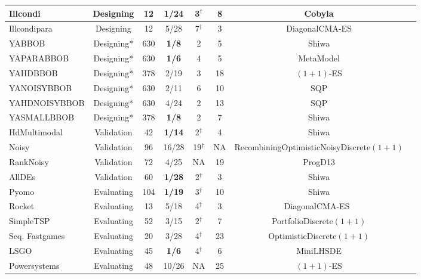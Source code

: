 \begin{table}[t]
{\begin{tabular}{|l|c|c|c|c|c|c|c|}
        Illcondi & Designing & 12 &\textbf{ 1/24 }&  3$^\dagger$ & 8 & {Cobyla} \\ \hline
        Illcondipara & Designing & 12 & 5/28 & 7$^\dagger$ & 3 &{ DiagonalCMA-ES} \\ \hline
        YABBOB & Designing* & 630 & \textbf{1/8} & 2 &   5 & Shiwa \\ \hline 
        YAPARABBOB & Designing* & 630 & \textbf{1/6} & 4 &    5 &  MetaModel\\ \hline 		
        YAHDBBOB & Designing* & 378 & 2/19 & 3 &   18 & {$(1+1)$-ES}\\ \hline
        YANOISYBBOB & Designing* & 630 & 2/11 & 6 & 10 & {SQP} \\ \hline
        YAHDNOISYBBOB & Designing* & 630 & 4/24 & 2 & 13 & {SQP} \\ \hline 		  
        YASMALLBBOB & Designing* & 378 & \textbf{1/8} & 2 & 7 & Shiwa \\ 		  \hline
        \hline
                HdMultimodal & Validation  & 42 & \textbf{1/14} &  2$^\dagger$ &4 & {Shiwa} \\ \hline
        Noisy & Validation & 96 & 16/28 & 19$^\dagger$ &NA & {RecombiningOptimisticNoisyDiscrete$(1+1)$}\\ \hline
        RankNoisy & Validation  & 72 & 4/25 & NA & 19 & {ProgD13} \\ \hline
        AllDEs & Validation & 60 & \textbf{1/28} &  2$^\dagger$ & 3 & {Shiwa} \\ \hline 		 \hline
        Pyomo& Evaluating & 104 &\textbf{ 1/19} & 3$^\dagger$ & 10 & {Shiwa} \\   \hline
        Rocket & Evaluating & 13 & 5/18 &  4$^\dagger$ & 3 & {DiagonalCMA-ES~\cite{diagcma}} \\   \hline
        SimpleTSP & Evaluating& 52 & 3/15 &  2$^\dagger$ & 7 & {PortfolioDiscrete$(1+1)$} \\   \hline
        Seq. Fastgames& Evaluating &  20 & 3/28 &  4$^\dagger$ & 23 & {OptimisticDiscrete$(1+1)$}\\    \hline
        LSGO& Evaluating & 45 & \textbf{1/6} & 4$^\dagger$ & 6 & {MiniLHSDE} \\ \hline
        Powersystems& Evaluating & 48 & {10/26} & NA & 25 & {$(1+1)$-ES} \\ \hline
        \end{tabular}} %
    \end{table}


